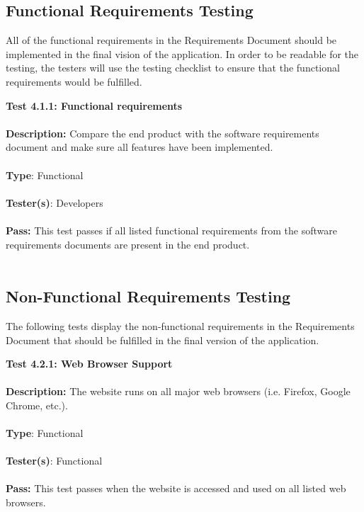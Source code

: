 \documentclass[12pt]{article}
\begin{document}
\subsection{Functional Requirements Testing}
All of the functional requirements in the Requirements Document should be implemented in the final vision of the application. In order to be readable for the testing, the testers will use the testing checklist to ensure that the functional requirements would be fulfilled.

\begin{tcolorbox}
\textbf{Test 4.1.1: Functional requirements } \\ \\
\textbf{Description:} Compare the end product with the software requirements document and make sure all features have been implemented. \\ \\
\textbf{Type}: Functional \\ \\
\textbf{Tester(s)}: Developers \\ \\
\textbf{Pass:} This test passes if all listed functional requirements from the software requirements documents are present in the end product. \\ \\
\end{tcolorbox}

\subsection{Non-Functional Requirements Testing}
The following tests display the non-functional requirements in the Requirements Document that should be fulfilled in the final version of the application. 

\begin{tcolorbox}
\textbf{Test 4.2.1: Web Browser Support} \\ \\
\textbf{Description:} The website runs on all major web browsers (i.e. Firefox, Google Chrome, etc.). \\ \\
\textbf{Type}: Functional \\ \\
\textbf{Tester(s)}: Functional \\ \\
\textbf{Pass:} This test passes when the website is accessed and used on all listed web browsers. \\ \\
\end{tcolorbox}
\end{document}
